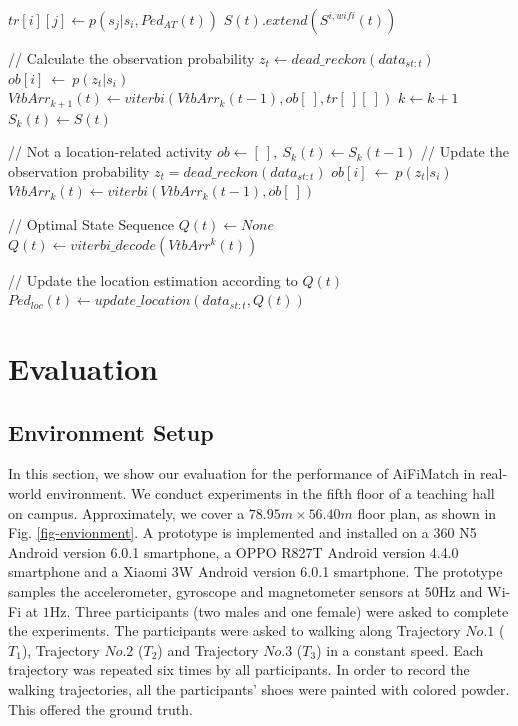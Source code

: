 \documentclass{llncs}
\begin{document}
\begin{algorithm}[t]
	\begin{algorithmic}[1]

		\STATE $tr[i][j] \leftarrow p(s_j|s_i,{Ped_{AT}(t)})$
		\ENDFOR
		\STATE $S(t).extend(S^{i,wifi}(t))$
		\ENDFOR
		
		\STATE // Calculate the observation probability		    
		\STATE ${z_t} \leftarrow dead\_reckon(data_{st:t})$
		\STATE $ob[i]\ \leftarrow\ p(z_t|s_i)$
		\ENDFOR
		\STATE ${VtbArr}_{k+1}(t) \leftarrow viterbi({VtbArr}_{k}(t-1), ob[\ ], tr[\ ][\ ])$
		\STATE $k \leftarrow k+1$
		\STATE $S_{k}(t) \leftarrow S(t)$
		
		\ELSE // Not a location-related activity
		\STATE $ob \leftarrow [\ ],\ S_{k}(t) \leftarrow S_{k}(t-1)$
		\STATE // Update the observation probability
		\STATE ${z_t}=dead\_reckon(data_{st:t})$
		\STATE $ob[i]\ \leftarrow\ p(z_t|s_i)$
		\ENDFOR
		\STATE ${VtbArr}_{k}(t) \leftarrow viterbi({VtbArr}_{k}(t-1), ob[\ ])$
		\ENDIF	
		
		\STATE // Optimal State Sequence
		\STATE ${Q(t)} \leftarrow None$
		\STATE ${Q(t)} \leftarrow viterbi\_decode(VtbArr^{k}(t))$
		\ENDIF
		
		\STATE // Update the location estimation according to $Q(t)$
		\STATE $Ped_{loc}(t) \leftarrow update\_location(data_{st:t}, Q(t))$
	\end{algorithmic}
\end{algorithm}
\vspace{-10pt}


\section{Evaluation}

\subsection{Environment Setup}

In this section, we show our evaluation for the performance of AiFiMatch in real-world environment. We conduct experiments in the fifth floor of a teaching hall on campus. Approximately, we cover a $78.95m \times 56.40m$ floor plan, as shown in Fig. \ref{fig-envionment}. A prototype is implemented and installed on a 360 N5 Android version 6.0.1 smartphone, a OPPO R827T Android version 4.4.0 smartphone and a Xiaomi 3W Android version 6.0.1 smartphone. The prototype samples the accelerometer, gyroscope and magnetometer sensors at $50$Hz and Wi-Fi at $1$Hz. Three participants (two males and one female) were asked to complete the experiments. The participants were asked to walking along Trajectory $No.1$ ($T_1$), Trajectory $No.2$ ($T_2$) and Trajectory $No.3$ ($T_3$) in a constant speed. Each trajectory was repeated six times by all participants. In order to record the walking trajectories, all the participants' shoes were painted with colored powder. This offered the ground truth.
\end{document}
